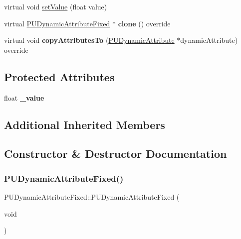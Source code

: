 \begin{DoxyCompactItemize}
\item 
virtual void \hyperlink{classPUDynamicAttributeFixed_af0a889c5b77c876a52e005da2f1a9f41}{set\+Value} (float value)
\item 
\mbox{\label{classPUDynamicAttributeFixed_ace4435bb42b6ed813eac4e27d36049e2}} 
virtual \hyperlink{classPUDynamicAttributeFixed}{P\+U\+Dynamic\+Attribute\+Fixed} $\ast$ {\bfseries clone} () override
\item 
\mbox{\label{classPUDynamicAttributeFixed_a8b0d5d76c43924d9d93e0ac9567cc9b0}} 
virtual void {\bfseries copy\+Attributes\+To} (\hyperlink{classPUDynamicAttribute}{P\+U\+Dynamic\+Attribute} $\ast$dynamic\+Attribute) override
\end{DoxyCompactItemize}
\subsection*{Protected Attributes}
\begin{DoxyCompactItemize}
\item 
\mbox{\label{classPUDynamicAttributeFixed_a5d434b5b4066c6631a4b520278a0249f}} 
float {\bfseries \+\_\+value}
\end{DoxyCompactItemize}
\subsection*{Additional Inherited Members}


\subsection{Constructor \& Destructor Documentation}
\mbox{\label{classPUDynamicAttributeFixed_a577697353325d80fe176bf309b33e4b2}} 
\subsubsection{\texorpdfstring{P\+U\+Dynamic\+Attribute\+Fixed()}{PUDynamicAttributeFixed()}\hspace{0.1cm}{\footnotesize\ttfamily [1/4]}}
{\footnotesize\ttfamily P\+U\+Dynamic\+Attribute\+Fixed\+::\+P\+U\+Dynamic\+Attribute\+Fixed (\begin{DoxyParamCaption}\item[{void}]{ }\end{DoxyParamCaption})}

